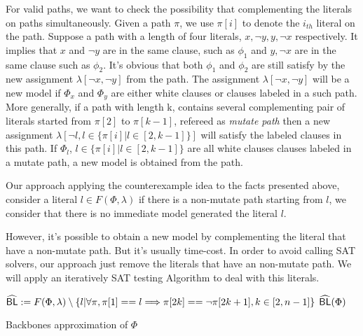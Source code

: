  For valid paths, we want to check the possibility that complementing the literals on paths simultaneously. Given a path $\pi$, we use $\pi[i]$ to denote the $i_{th}$ literal on the path. Suppose a path with a length of four literals, $x, \neg y, y, \neg x$ respectively. It implies that $x$ and $\neg y$ are in the same clause, such as $\phi_1$ and $y, \neg x$ are in the same clause such as $\phi_2$. It's obvious that both $\phi_1$ and $\phi_2$ are still satisfy by the new assignment $\lambda[\neg x, \neg y]$ from the path. The assignment $\lambda[\neg x, \neg y]$ will be a new model if $\Phi_x$ and $\Phi_y$ are either white clauses or clauses labeled in a such path. More generally, if a path with length k, contains several complementing pair of literals started from $\pi[2]$ to $\pi[k-1]$, refereed as \emph{mutate path} then a new assignment $\lambda[\neg l, l\in\{\pi[i] | l\in[2, k-1]\}]$ will satisfy the labeled clauses in this path. If $\Phi_l$, $l\in\{\pi[i] | l\in[2, k-1]\}$ are all white clauses clauses labeled in a mutate path, a new model is obtained from the path.

 Our approach applying the counterexample idea to the facts presented above, consider a literal $l\in F(\Phi, \lambda)$ if there is a non-mutate path starting from $l$, we consider that there is no immediate model generated the literal $l$.

 However, it's possible to obtain a new model by complementing the literal that have a non-mutate path. But it's usually time-cost. In order to avoid calling SAT solvers, our approach just remove the literals that have an non-mutate path. We will apply an iteratively SAT testing Algorithm to deal with this literals.


\begin{algorithm}
\SetAlgoShortEnd
\SetFillComment
{}

${\sf \widehat{BL}}:=F(\Phi, \lambda)\setminus\{l | \forall \pi, \pi[1]==l\Longrightarrow\pi[2k]==\neg\pi[2k+1], k\in[2,n-1]\}$\;
\Return ${\sf \widehat{BL}}(\Phi)$\;
\caption{Backbones approximation of $\Phi$}
\label{alg:nBLo}
\end{algorithm}


